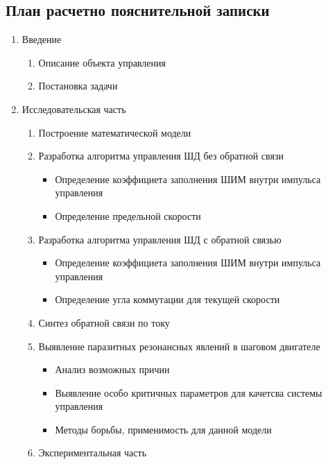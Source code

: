 \newpage
\subsection{План расчетно пояснительной записки}

\begin{enumerate}
    \item Введение
        \begin{enumerate}
            \item Описание объекта управления
            \item Постановка задачи
        \end{enumerate}
    \item Исследовательская часть
        \begin{enumerate}
            \item Построение математической модели
            \item Разработка алгоритма управления ШД без обратной связи
                \begin{itemize}
                    \item Определение коэффициета заполнения ШИМ внутри импульса управления
                    \item Определение предельной скорости
                \end{itemize}
            \item Разработка алгоритма управления ШД с обратной связью
                \begin{itemize}
                    \item Определение коэффициета заполнения ШИМ внутри импульса управления
                    \item Определение угла коммутации для текущей скорости
                \end{itemize}
            \item Синтез обратной связи по току
            \item Выявление паразитных резонансных явлений в шаговом двигателе
                \begin{itemize}
                    \item Анализ возможных причин
                    \item Выявление особо критичных параметров для качетсва системы управления
                    \item Методы борьбы, применимость для данной модели
                \end{itemize}
            \item Экспериментальная часть

\end{enumerate}
\end{enumerate}
